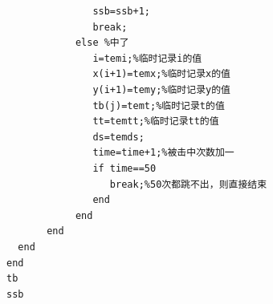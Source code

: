 \documentclass[12pt]{article}%
\begin{document}
\begin{lstlisting}
               ssb=ssb+1;
               break;
            else %中了
               i=temi;%临时记录i的值
               x(i+1)=temx;%临时记录x的值
               y(i+1)=temy;%临时记录y的值
               tb(j)=temt;%临时记录t的值
               tt=temtt;%临时记录tt的值
               ds=temds;
               time=time+1;%被击中次数加一
               if time==50
                  break;%50次都跳不出，则直接结束
               end
            end
       end
  end
end
tb
ssb
\end{lstlisting}
\end{document}
